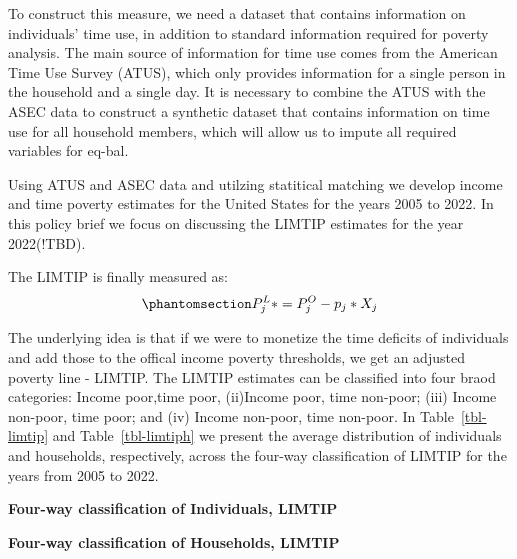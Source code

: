 \documentclass[
  11pt,
]{article}
\begin{document}
To construct this measure, we need a dataset that contains information
on individuals' time use, in addition to standard information required
for poverty analysis. The main source of information for time use comes
from the American Time Use Survey (ATUS), which only provides
information for a single person in the household and a single day. It is
necessary to combine the ATUS with the ASEC data to construct a
synthetic dataset that contains information on time use for all
household members, which will allow us to impute all required variables
for eq-bal.

Using ATUS and ASEC data and utilzing statitical matching we develop
income and time poverty estimates for the United States for the years
2005 to 2022. In this policy brief we focus on discussing the LIMTIP
estimates for the year 2022(!TBD).

The LIMTIP is finally measured as:
\begin{equation}\phantomsection\label{eq-limtip}{P_{j}^L* = P_{j}^O- p_{j}*X_{j}
}\end{equation}

The underlying idea is that if we were to monetize the time deficits of
individuals and add those to the offical income poverty thresholds, we
get an adjusted poverty line - LIMTIP. The LIMTIP estimates can be
classified into four braod categories: Income poor,time poor, (ii)Income
poor, time non-poor; (iii) Income non-poor, time poor; and (iv) Income
non-poor, time non-poor. In Table~\ref{tbl-limtip} and
Table~\ref{tbl-limtiph} we present the average distribution of
individuals and households, respectively, across the four-way
classification of LIMTIP for the years from 2005 to 2022.

\begin{table}

\caption{\label{tbl-limtip}\textbf{Four-way classification of
Individuals, LIMTIP }}


\end{table}%

\begin{table}

\caption{\label{tbl-limtiph}\textbf{Four-way classification of
Households, LIMTIP }}


\end{table}%
\end{document}
